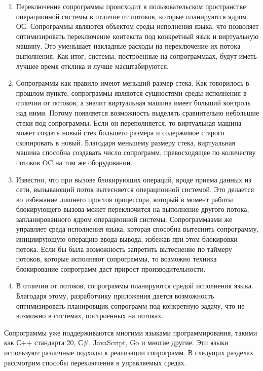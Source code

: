 	\begin{enumerate}
		\item Переключение сопрограммы происходит в пользовательском пространстве операционной системы в отличие от
		потоков, которые планируются ядром ОС. Сопрограммы являются объектом среды исполнения языка, что
		позволяет оптимизировать переключение контекста под конкретный язык и виртуальную машину. Это уменьшает
		накладные расходы на переключение их потока выполнения. Как итог, системы, построенные на сопрограммаах, будут
		иметь лучшее время отклика и лучше масштабируются.
		\item Сопрограммы как правило имеют меньший размер стека. Как говорилось в прошлом пункте,
		сопрограммы являются сущностями среды исполнения в отличии от потоков, а значит виртуальная машина имеет больший
		контроль над ними. Потому появляется возможность выделять сравнительно небольшие стеки под сопрограммы. 
		Если он переполняется, то виртуальная машина может создать новый стек большего размера и содержимое старого
		скопировать в новый. Благодаря меньшему размеру стека, виртуальная машина способна создавать число
		сопрограмм, превосходящее по количеству потоков OC на том же оборудовании.
		\item Известно, что при вызове блокирующих операций, вроде приема данных из сети, вызывающий поток вытесняется
		операционной системой\cite{linux-api}. Это делается во избежание лишнего простоя процессора, который в момент
		работы блокирующего вызова может переключится на выполнение другого потока, запланированного ядром операционной
		системы. Сопрограммаами же управляет среда исполнения языка, которая способна вытеснить сопрограмму,
		инициирующую операцию ввода вывода, избежав при	этом блокировки потока. Если бы была возможность запретить
		вытеснение по таймеру потоков, которые исполняют сопрограммы, то возможно техника блокирование сопрограмм даст прирост производительности.
		\item В отличии от потоков, сопрограммы планируются средой исполнения языка. Благодаря этому, разработчику
		приложения дается возможность оптимизировать планировщик сопрограмм	под конкретную задачу, что не возможно в
		системах, построенных на потоках.
	\end{enumerate}
	Сопрограммы уже поддерживаются многими языками программирования, такими как С++ стандарта 20, С\#, JavaScript,
	Go и многие другие. Эти языки используют различные подходы к реализации сопрограмм. В следущих разделах 
	рассмотрим способы переключения в управляемых средах.
	

